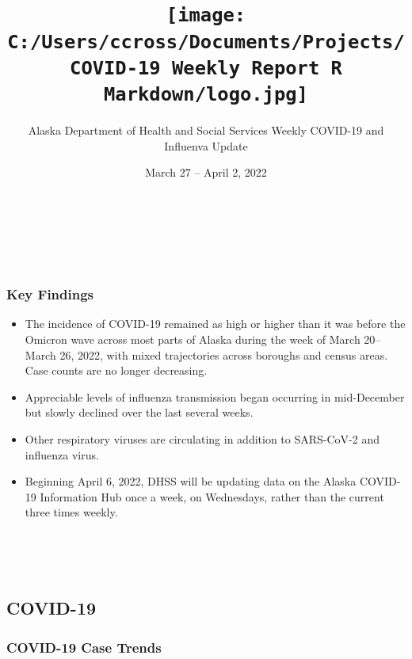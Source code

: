 \documentclass[
]{article}
\title{\texttt{[image: C:/Users/ccross/Documents/Projects/COVID-19 Weekly Report R Markdown/logo.jpg]}}
\author{Alaska Department of Health and Social Services Weekly COVID-19
and Influenva Update}
\date{March 27 -- April 2, 2022}
\begin{document}
\maketitle

~

~

\hypertarget{key-findings}{%
\subsubsection{Key Findings}\label{key-findings}}

\begin{itemize}
\item
  The incidence of COVID-19 remained as high or higher than it was
  before the Omicron wave across most parts of Alaska during the week of
  March 20--March 26, 2022, with mixed trajectories across boroughs and
  census areas. Case counts are no longer decreasing.
\item
  Appreciable levels of influenza transmission began occurring in
  mid-December but slowly declined over the last several weeks.
\item
  Other respiratory viruses are circulating in addition to SARS-CoV-2
  and influenza virus.
\item
  Beginning April 6, 2022, DHSS will be updating data on the Alaska
  COVID-19 Information Hub once a week, on Wednesdays, rather than the
  current three times weekly.
\end{itemize}

~

~

\hypertarget{covid-19}{%
\subsection{COVID-19}\label{covid-19}}

\hypertarget{covid-19-case-trends}{%
\subsubsection{COVID-19 Case Trends}\label{covid-19-case-trends}}
\end{document}
